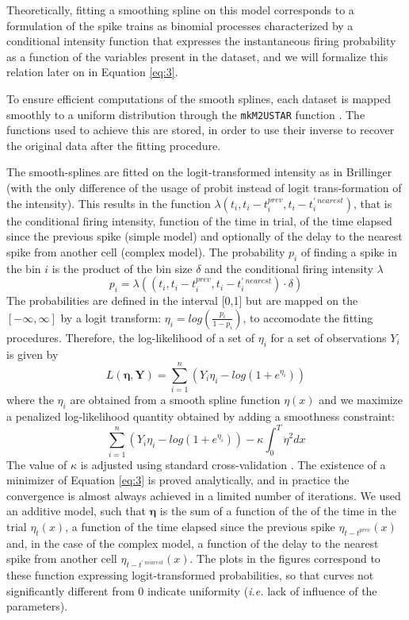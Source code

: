 Theoretically, fitting a smoothing spline on this model corresponds to a formulation of the spike trains as binomial processes characterized by a conditional intensity function that expresses the instantaneous firing probability as a function of the variables present in the dataset, and we will formalize this relation later on in Equation \ref{eq:3}.

To ensure efficient computations of the smooth splines, each dataset is mapped smoothly to a uniform distribution through the \texttt{mkM2USTAR} function \cite{pouzat2009automatic}. The functions used to achieve this are stored, in order to use their inverse to recover the original data after the fitting procedure.

The smooth-splines are fitted on the logit-transformed intensity as in Brillinger \cite{brillinger1988maximum} (with the only difference of the usage of probit instead of logit trans-formation of the intensity). This results in the function $\lambda(t_i, t_i - t^{prev}_i, t_i-t^{\prime\ nearest}_i)$, that is the conditional firing intensity, function of the time in trial, of the time elapsed since the previous spike (simple model) and optionally of the delay to the nearest spike from another cell (complex model). The probability $p_i$ of finding a spike in the bin  $i$ is the product of the bin size $\delta$ and the conditional firing intensity $\lambda$
\begin{equation}
	p_i = \lambda((t_i, t_i - t^{prev}_i, t_i-t^{\prime\ nearest}_i)\cdot\delta)
	\label{eq:1}
\end{equation}
The probabilities are defined in the interval [0,1] but are mapped on the $[-\infty,\infty]$ by a logit transform: $\eta_i = log(\frac{p_i}{1-p_i})$, to accomodate the fitting procedures. Therefore, the log-likelihood of a set of $\eta_i$ for a set of observations $Y_i$ is given by
\begin{equation}
	L(\bm{\eta}, \bm{Y}) = \sum^n_{i=1}(Y_i\eta_i-log(1+e^{\eta_i}))
	\label{eq:2}
\end{equation}
where the $\eta_i$ are obtained from a smooth spline function $\eta(x)$ and we maximize a penalized log-likelihood quantity obtained by adding a smoothness constraint: 
\begin{equation}
	\sum^n_{i=1}(Y_i\eta_i-log(1+e^{\eta_i})) - \kappa\int_0^T\ddot{\eta}^2dx
	\label{eq:3}
\end{equation}
The value of $\kappa$ is adjusted using standard cross-validation \cite{wahba1990spline}. The existence of a minimizer of Equation \ref{eq:3} is proved analytically, and in practice the convergence is almost always achieved in a limited number of iterations. We used an additive model, such that $\bm{\eta}$ is the sum of a function of the of the time in the trial $\eta_t(x)$, a function of the time elapsed since the previous spike $\eta_{t-t^{prev}}(x)$ and, in the case of the complex model, a function of the delay to the nearest spike from another cell $\eta_{t-t^{\prime\ nearest}}(x)$. The plots in the figures correspond to these function expressing logit-transformed probabilities, so that curves not significantly different from 0 indicate uniformity (\emph{i.e.} lack of influence of the parameters).

